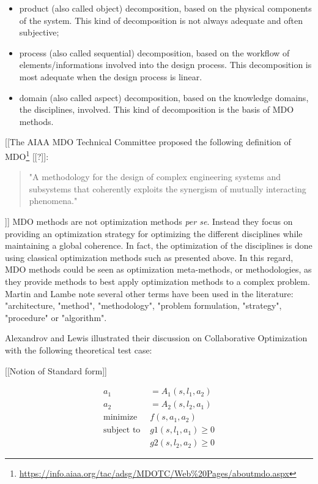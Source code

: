 \begin{itemize}
\item product (also called object) decomposition, based on the physical components of the system. This kind of decomposition is not always adequate and often subjective;
\item process  (also called sequential) decomposition, based on the workflow of elements/informations involved into the design process. This decomposition is most adequate when the design process is linear.
\item domain (also called aspect) decomposition, based on the knowledge domains, the disciplines, involved. This kind of decomposition is the basis of MDO methods.
\end{itemize}

[[The AIAA MDO Technical Committee proposed the following definition of MDO\footnote{\url{https://info.aiaa.org/tac/adsg/MDOTC/Web\%20Pages/aboutmdo.aspx}} [[\cite{american1991current}?]]:
 \begin{quote}
"A methodology for the design of complex engineering systems and subsystems that coherently exploits the synergism of mutually interacting phenomena."
\end{quote}]]
MDO methods are not optimization methods \emph{per se}. Instead they focus on providing an optimization strategy for optimizing the different disciplines while maintaining a global coherence. In fact, the optimization of the disciplines is done using classical optimization methods such as presented above. In this regard, MDO methods could be seen as optimization meta-methods, or methodologies, as they provide methods to best apply optimization methods to a complex problem. Martin and Lambe \cite{Lambe:2011:A} note several other terms have been used in the literature:  "architecture, "method", "methodology", "problem formulation, "strategy", "procedure" or "algorithm".

Alexandrov and Lewis illustrated their discussion on Collaborative Optimization \cite{NataliaM.:2000:ACA:886733} with the following theoretical test case:

[[Notion of Standard form]]

\begin{align*}
a_1 &= A_1(s, l_1, a_2) \\
a_2 &= A_2(s, l_2, a_1) \\
\text{minimize } &f(s, a_1, a_2) \\
\text{subject to } &g1(s, l_1, a_1) \geq 0 \\
								&g2(s, l_2, a_2) \geq 0
\end{align*}

